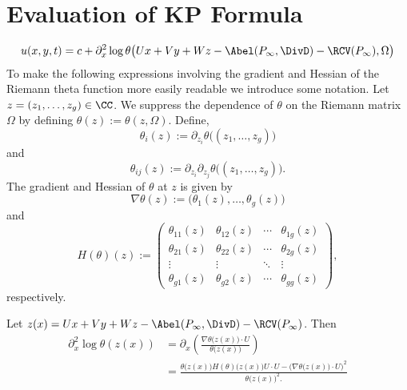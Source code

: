 \section{Evaluation of KP Formula}

\begin{equation*}
  u(x,y,t) = c + \partial_x^2 \log
  \theta\big(
  Ux + Vy + Wz - \Abel(P_\infty,\DivD) - \RCV(P_\infty), \Omega
  \big)
\end{equation*}
To make the following expressions involving the gradient and Hessian of the
Riemann theta function more easily readable we introduce some notation. Let $z
= (z_1, \ldots, z_g) \in \CC$. We suppress the dependence of $\theta$ on the
Riemann matrix $\Omega$ by defining $\theta(z) := \theta(z,\Omega)$. Define,
\begin{equation} \label{eqn:theta-deriv1-compact}
  \theta_i(z)
  :=
  \partial_{z_i} \theta \big( (z_1, \ldots, z_g) \big)
\end{equation}
and
\begin{equation} \label{eqn:theta-deriv2-compact}
  \theta_{ij}(z)
  :=
  \partial_{z_i} \partial_{z_j} \theta \big( (z_1, \ldots, z_g) \big).
\end{equation}
The gradient and Hessian of $\theta$ at $z$ is given by
\begin{equation} \label{eqn:theta-grad-compact}
  \nabla \theta(z)
  :=
  \big( \theta_1(z), \ldots, \theta_g(z) \big)
\end{equation}
and
\begin{equation} \label{eqn:theta-hess-compact}
  H(\theta)(z)
  :=
  \begin{pmatrix}
    \theta_{11}(z) & \theta_{12}(z) & \cdots & \theta_{1g}(z) \\
    \theta_{21}(z) & \theta_{22}(z) & \cdots & \theta_{2g}(z) \\
    \vdots         & \vdots         & \ddots & \vdots         \\
    \theta_{g1}(z) & \theta_{g2}(z) & \cdots & \theta_{gg}(z)
  \end{pmatrix},
\end{equation}
respectively.

Let $z(x) = Ux + Vy + Wz - \Abel(P_\infty,\DivD) - \RCV(P_\infty)$. Then
\begin{align}
  \partial_x^2 \log \theta(z(x))
  &=
  \partial_x \left(
  \frac{
    \nabla \theta\big(z(x)\big) \cdot U
  }{
    \theta\big(z(x)\big)
  }
  \right) \\
  &=
  \frac{
    \theta\big(z(x)\big) H(\theta)\big(z(x)\big)U \cdot U
    - \Big( \nabla \theta\big(z(x)\big) \cdot U \Big)^2
  }{
    \theta\big(z(x)\big)^2.
  }
\end{align}
